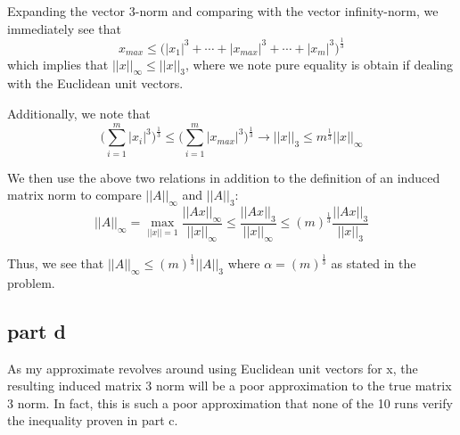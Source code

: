 \documentclass[a4paper,12pt]{article}
\begin{document}
Expanding the vector 3-norm and comparing with the vector infinity-norm, we immediately see that
\begin{equation}
x_{max}\leq \bigg( |x_1|^3 + \cdots + |x_{max}|^3 + \cdots + |x_m|^3 \bigg)^{\frac{1}{3}}
\end{equation}
which implies that $||x||_{\infty}\leq ||x||_3$, where we note pure equality is obtain if dealing with the Euclidean unit vectors. 

Additionally, we note that
\begin{equation}
\bigg( \sum_{i=1}^m |x_i|^3   \bigg)^{\frac{1}{3}}   \leq \bigg( \sum_{i=1}^m |x_{max}|^3   \bigg)^{\frac{1}{3}} \rightarrow ||x||_3 \leq m^{\frac{1}{3}} ||x||_{\infty}
\end{equation}

We then use the above two relations in addition to the definition of an induced matrix norm to compare $||A||_{\infty}$ and $||A||_3$:
\begin{equation}
||A||_{\infty} =\max_{||x||=1} \frac{||Ax||_{\infty}}{||x||_{\infty}} \leq \frac{||Ax||_3}{||x||_{\infty}} \leq (m)^{\frac{1}{3}}\frac{||Ax||_3}{||x||_3}
\end{equation}

Thus, we see that $||A||_{\infty} \leq (m)^{\frac{1}{3}}||A||_3$ where $\alpha =(m)^{\frac{1}{3}} $ as stated in the problem.

\subsection{part d}
As my approximate revolves around using Euclidean unit vectors for x, the resulting induced matrix 3 norm will be a poor approximation to the true matrix 3 norm. In fact, this is such a poor approximation that none of the 10 runs verify the inequality proven in part c. 
\end{document}
